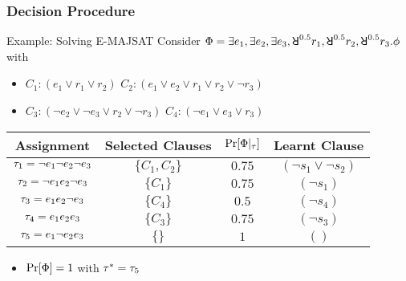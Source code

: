 \begin{frame}
    \frametitle{Decision Procedure}
    \begin{block}{Example: Solving E-MAJSAT}
        Consider $\Qf=\exists e_1,\exists e_2,\exists e_3,\random{0.5} r_1,\random{0.5} r_2,\random{0.5} r_3.\pf$ with
        \begin{itemize}
            \item[] $C_1: (e_1 \lor r_1 \lor r_2)$ $C_2: (e_1 \lor e_2 \lor r_1 \lor r_2 \lor \lnot r_3)$
            \item[] $C_3: (\lnot e_2 \lor \lnot e_3 \lor r_2 \lor \lnot r_3)$ $C_4: (\lnot e_1 \lor e_3 \lor r_3)$
        \end{itemize}
        \pause
        \begin{table}[t]
            \centering
            \small
            \begin{tabular}{c|c|c|c}
                Assignment                            & Selected Clauses & $\Pr[\Phi|_{\tau}]$ & Learnt Clause                \\
                \hline
                $\tau_1=\lnot e_1 \lnot e_2 \lnot e_3$ & $\{C_1,C_2\}$    & $0.75$                 & $(\lnot s_1 \lor \lnot s_2)$ \\
                \pause
                $\tau_2=\lnot e_1 e_2 \lnot e_3$       & $\{C_1\}$        & $0.75$                 & $(\lnot s_1)$                \\
                \pause
                $\tau_3=e_1 e_2 \lnot e_3$             & $\{C_4\}$        & $0.5$                  & $(\lnot s_4)$                \\
                \pause
                $\tau_4=e_1 e_2 e_3$                   & $\{C_3\}$        & $0.75$                 & $(\lnot s_3)$                \\
                \pause
                $\tau_5=e_1 \lnot e_2 e_3$             & $\{\}$           & $1$                    & $()$
            \end{tabular}
        \end{table}
        \pause
        \begin{itemize}
            \item $\Pr[\Phi]=1$ with $\tau^*=\tau_5$
        \end{itemize}
    \end{block}
\end{frame}


